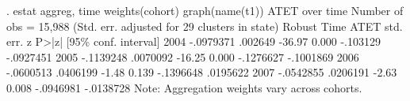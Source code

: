 . estat aggreg, time weights(cohort) graph(name(t1))
{\smallskip}
ATET over time                                          Number of obs = 15,988
{\smallskip}
                                 (Std. err. adjusted for 29 clusters in state)
             {\VBAR}               Robust
        Time {\VBAR}       ATET   std. err.      z    P>|z|     [95\% conf. interval]
        2004 {\VBAR}  -.0979371    .002649   -36.97   0.000     -.103129   -.0927451
        2005 {\VBAR}  -.1139248   .0070092   -16.25   0.000    -.1276627   -.1001869
        2006 {\VBAR}  -.0600513   .0406199    -1.48   0.139    -.1396648    .0195622
        2007 {\VBAR}  -.0542855   .0206191    -2.63   0.008    -.0946981   -.0138728
Note: Aggregation weights vary across cohorts.
